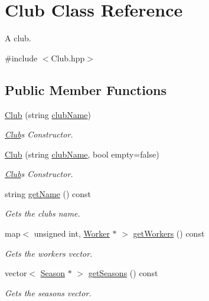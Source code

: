 \hypertarget{class_club}{}\section{Club Class Reference}
\label{class_club}


A club.  




{\ttfamily \#include $<$Club.\+hpp$>$}

\subsection*{Public Member Functions}
\begin{DoxyCompactItemize}
\item 
\hyperlink{class_club_a53bcd4e9c5b32098f2170d6800b4279a}{Club} (string \hyperlink{class_club_acd01c6183dc0747ad3c3ab8167bd860e}{club\+Name})
\begin{DoxyCompactList}\small\item\em \hyperlink{class_club}{Club}\textquotesingle{}s Constructor. \end{DoxyCompactList}\item 
\hyperlink{class_club_a07cefb3e65bdcd9144abc29d3203bf4b}{Club} (string \hyperlink{class_club_acd01c6183dc0747ad3c3ab8167bd860e}{club\+Name}, bool empty=false)
\begin{DoxyCompactList}\small\item\em \hyperlink{class_club}{Club}\textquotesingle{}s Constructor. \end{DoxyCompactList}\item 
string \hyperlink{class_club_a68e75a8eba166549cffc62f53b448ad7}{get\+Name} () const
\begin{DoxyCompactList}\small\item\em Gets the club\textquotesingle{}s name. \end{DoxyCompactList}\item 
map$<$ unsigned int, \hyperlink{class_worker}{Worker} $\ast$ $>$ \hyperlink{class_club_abbfc819640d18b6b19d0741865d37e37}{get\+Workers} () const
\begin{DoxyCompactList}\small\item\em Gets the workers\textquotesingle{} vector. \end{DoxyCompactList}\item 
vector$<$ \hyperlink{class_season}{Season} $\ast$ $>$ \hyperlink{class_club_ac150576208dbfa2a823003db3ae35601}{get\+Seasons} () const
\begin{DoxyCompactList}\small\item\em Gets the seasons\textquotesingle{} vector. \end{DoxyCompactList}\item 

\end{DoxyCompactItemize}
